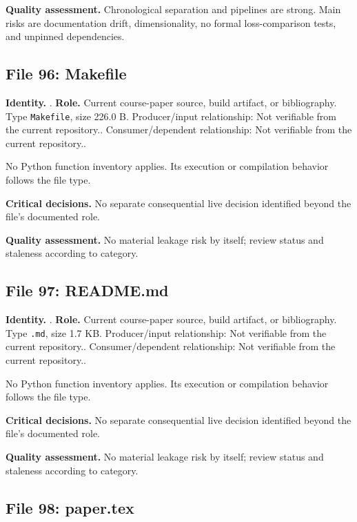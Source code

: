 \documentclass[
  11pt,
  a4paper]{article}
\begin{document}
\textbf{Quality assessment.} Chronological separation and pipelines are
strong. Main risks are documentation drift, dimensionality, no formal
loss-comparison tests, and unpinned dependencies.

\subsection{File 96: Makefile}\label{file-8332949823621203692}

\textbf{Identity.} . \textbf{Role.} Current
course-paper source, build artifact, or bibliography. Type
\texttt{Makefile}, size 226.0 B. Producer/input relationship: Not
verifiable from the current repository.. Consumer/dependent
relationship: Not verifiable from the current repository..

No Python function inventory applies. Its execution or compilation
behavior follows the file type.

\textbf{Critical decisions.} No separate consequential live decision
identified beyond the file's documented role.

\textbf{Quality assessment.} No material leakage risk by itself; review
status and staleness according to category.

\subsection{File 97: README.md}\label{file-1731439228128454963}

\textbf{Identity.} . \textbf{Role.} Current
course-paper source, build artifact, or bibliography. Type \texttt{.md},
size 1.7 KB. Producer/input relationship: Not verifiable from the
current repository.. Consumer/dependent relationship: Not verifiable
from the current repository..

No Python function inventory applies. Its execution or compilation
behavior follows the file type.

\textbf{Critical decisions.} No separate consequential live decision
identified beyond the file's documented role.

\textbf{Quality assessment.} No material leakage risk by itself; review
status and staleness according to category.

\subsection{File 98: paper.tex}\label{file-7914020158534097357}
\end{document}
